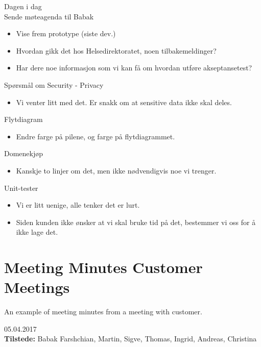 {\large{Dagen i dag}}\\
{\large{Sende møteagenda til Babak}}
\begin{itemize} 
\setlength\itemsep{-0.7em}
    \item Vise frem prototype (siste dev.)
    \item Hvordan gikk det hos Helsedirektoratet, noen tilbakemeldinger?
    \item Har dere noe informasjon som vi kan få om hvordan utføre akseptansetest?
\end{itemize}

{\large{Spørsmål om Security - Privacy}}
\begin{itemize}
\setlength\itemsep{-0.7em}
    \item Vi venter litt med det. Er snakk om at sensitive data ikke skal deles.
\end{itemize}

{\large{Flytdiagram}}
\begin{itemize}
\setlength\itemsep{-0.7em}
    \item Endre farge på pilene, og farge på flytdiagrammet.
\end{itemize}

{\large{Domenekjøp}}
\begin{itemize}
\setlength\itemsep{-0.7em}
    \item Kanskje to linjer om det, men ikke nødvendigvis noe vi trenger.
\end{itemize}

{\large{Unit-tester}}
\begin{itemize} 
\setlength\itemsep{-0.7em}
    \item Vi er litt uenige, alle tenker det er lurt.
    \item Siden kunden ikke ønsker at vi skal bruke tid på det, bestemmer vi oss for å ikke lage det.
\end{itemize}




\section{Meeting Minutes Customer Meetings}
\label{meeting_minutes_customer_meetings}

An example of meeting minutes from a meeting with customer.

{\Large{05.04.2017}}\\
\textbf{Tilstede:} Babak Farshchian, Martin, Sigve, Thomas, Ingrid, Andreas, Christina\\


